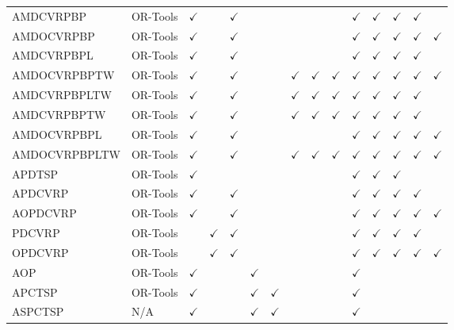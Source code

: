 \documentclass{article}
\theoremstyle{plain}
\theoremstyle{definition}
\theoremstyle{remark}
\begin{document}
\begin{table}[h!]
{\begin{tabular}{l|l|cc|cccccc|ccccc}
    AMDCVRPBP&OR-Tools     & $\checkmark$ & & $\checkmark$ & & & & & & $\checkmark$ & $\checkmark$ & $\checkmark$ & $\checkmark$ & \\
    AMDOCVRPBP&OR-Tools    & $\checkmark$ & & $\checkmark$ & & & & & & $\checkmark$ & $\checkmark$ & $\checkmark$ & $\checkmark$ & $\checkmark$ \\
    AMDCVRPBPL&OR-Tools    & $\checkmark$ & & $\checkmark$ & & & & & & $\checkmark$ & $\checkmark$ & $\checkmark$ & $\checkmark$ & \\
    AMDOCVRPBPTW&OR-Tools  & $\checkmark$ & & $\checkmark$ & & & $\checkmark$ & $\checkmark$ & $\checkmark$ & $\checkmark$ & $\checkmark$ & $\checkmark$ & $\checkmark$ & $\checkmark$ \\
    AMDCVRPBPLTW&OR-Tools   & $\checkmark$ & & $\checkmark$ & & & $\checkmark$ & $\checkmark$ & $\checkmark$ & $\checkmark$ & $\checkmark$ & $\checkmark$ & $\checkmark$ & \\
    AMDCVRPBPTW&OR-Tools    & $\checkmark$ & & $\checkmark$ & & & $\checkmark$ & $\checkmark$ & $\checkmark$ & $\checkmark$ & $\checkmark$ & $\checkmark$ & $\checkmark$ & \\
    AMDOCVRPBPL&OR-Tools   & $\checkmark$ & & $\checkmark$ & & & & & & $\checkmark$ & $\checkmark$ & $\checkmark$ & $\checkmark$ & $\checkmark$ \\
    AMDOCVRPBPLTW &OR-Tools & $\checkmark$ & & $\checkmark$ & & & $\checkmark$ & $\checkmark$ & $\checkmark$ & $\checkmark$ & $\checkmark$ & $\checkmark$ & $\checkmark$ & $\checkmark$ \\
   \midrule
    APDTSP& OR-Tools    & $\checkmark$ & & & & & & & & $\checkmark$ & $\checkmark$ & $\checkmark$ & & \\
    APDCVRP& OR-Tools    & $\checkmark$ & & $\checkmark$ & & & & & & $\checkmark$ & $\checkmark$ & $\checkmark$ & $\checkmark$ & \\
    AOPDCVRP& OR-Tools   & $\checkmark$ & & $\checkmark$ & & & & & & $\checkmark$ & $\checkmark$ & $\checkmark$ & $\checkmark$ & $\checkmark$ \\
     PDCVRP& OR-Tools     & & $\checkmark$ & $\checkmark$ & & & & & & $\checkmark$ & $\checkmark$ & $\checkmark$ & $\checkmark$ & \\
    OPDCVRP& OR-Tools    & & $\checkmark$ & $\checkmark$ & & & & & & $\checkmark$ & $\checkmark$ & $\checkmark$ & $\checkmark$ & $\checkmark$ \\
    \midrule
    AOP&OR-Tools &$\checkmark$ &  & & $\checkmark$ & & & & & $\checkmark$ & & & & \\
    APCTSP&OR-Tools &$\checkmark$  & & & $\checkmark$ & $\checkmark$ & & & & $\checkmark$ & & & & \\
    ASPCTSP& N/A     &$\checkmark$ &  & & $\checkmark$ & $\checkmark$ & & & & $\checkmark$ & & & & \\
    \bottomrule[0.5mm]
  \end{tabular}
  }
\end{table}
\end{document}

